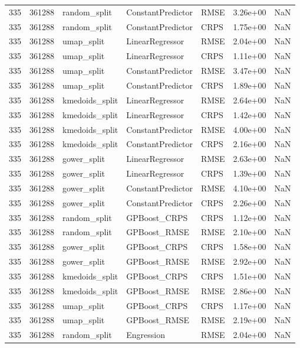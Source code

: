 \begin{tabular}{rrlllrr}
335 & 361288 & random\_split & ConstantPredictor & RMSE & 3.26e+00 & NaN \\
335 & 361288 & random\_split & ConstantPredictor & CRPS & 1.75e+00 & NaN \\
335 & 361288 & umap\_split & LinearRegressor & RMSE & 2.04e+00 & NaN \\
335 & 361288 & umap\_split & LinearRegressor & CRPS & 1.11e+00 & NaN \\
335 & 361288 & umap\_split & ConstantPredictor & RMSE & 3.47e+00 & NaN \\
335 & 361288 & umap\_split & ConstantPredictor & CRPS & 1.89e+00 & NaN \\
335 & 361288 & kmedoids\_split & LinearRegressor & RMSE & 2.64e+00 & NaN \\
335 & 361288 & kmedoids\_split & LinearRegressor & CRPS & 1.42e+00 & NaN \\
335 & 361288 & kmedoids\_split & ConstantPredictor & RMSE & 4.00e+00 & NaN \\
335 & 361288 & kmedoids\_split & ConstantPredictor & CRPS & 2.16e+00 & NaN \\
335 & 361288 & gower\_split & LinearRegressor & RMSE & 2.63e+00 & NaN \\
335 & 361288 & gower\_split & LinearRegressor & CRPS & 1.39e+00 & NaN \\
335 & 361288 & gower\_split & ConstantPredictor & RMSE & 4.10e+00 & NaN \\
335 & 361288 & gower\_split & ConstantPredictor & CRPS & 2.26e+00 & NaN \\
335 & 361288 & random\_split & GPBoost\_CRPS & CRPS & 1.12e+00 & NaN \\
335 & 361288 & random\_split & GPBoost\_RMSE & RMSE & 2.10e+00 & NaN \\
335 & 361288 & gower\_split & GPBoost\_CRPS & CRPS & 1.58e+00 & NaN \\
335 & 361288 & gower\_split & GPBoost\_RMSE & RMSE & 2.92e+00 & NaN \\
335 & 361288 & kmedoids\_split & GPBoost\_CRPS & CRPS & 1.51e+00 & NaN \\
335 & 361288 & kmedoids\_split & GPBoost\_RMSE & RMSE & 2.86e+00 & NaN \\
335 & 361288 & umap\_split & GPBoost\_CRPS & CRPS & 1.17e+00 & NaN \\
335 & 361288 & umap\_split & GPBoost\_RMSE & RMSE & 2.19e+00 & NaN \\
335 & 361288 & random\_split & Engression & RMSE & 2.04e+00 & NaN \\

\end{tabular}
